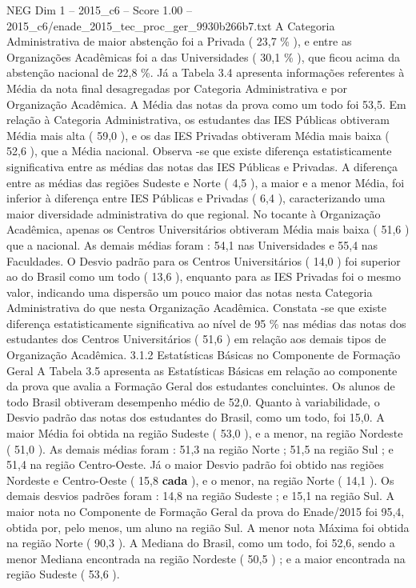 \begin{textsample}{NEG Dim 1 – 2015\_c6 – Score 1.00 – 2015\_c6/enade\_2015\_tec\_proc\_ger\_9930b266b7.txt}
A Categoria Administrativa de maior abstenção foi a Privada ( 23,7 \% ), e entre as Organizações Acadêmicas foi a das Universidades ( 30,1 \% ), que ficou acima da abstenção nacional de 22,8 \%.
Já a Tabela 3.4 apresenta informações referentes à Média da nota final desagregadas por Categoria Administrativa e por Organização Acadêmica.
A Média das notas da prova como um todo foi 53,5.
Em relação à Categoria Administrativa, os estudantes das IES Públicas obtiveram Média mais alta ( 59,0 ), e os das IES Privadas obtiveram Média mais baixa ( 52,6 ), que a Média nacional.
Observa -se que existe diferença estatisticamente significativa entre as médias das notas das IES Públicas e Privadas.
A diferença entre as médias das regiões Sudeste e Norte ( 4,5 ), a maior e a menor Média, foi inferior à diferença entre IES Públicas e Privadas ( 6,4 ), caracterizando uma maior diversidade administrativa do que regional.
No tocante à Organização Acadêmica, apenas os Centros Universitários obtiveram Média mais baixa ( 51,6 ) que a nacional.
As demais médias foram : 54,1 nas Universidades e 55,4 nas Faculdades.
O Desvio padrão para os Centros Universitários ( 14,0 ) foi superior ao do Brasil como um todo ( 13,6 ), enquanto para as IES Privadas foi o mesmo valor, indicando uma dispersão um pouco maior das notas nesta Categoria Administrativa do que nesta Organização Acadêmica.
Constata -se que existe diferença estatisticamente significativa ao nível de 95 \% nas médias das notas dos estudantes dos Centros Universitários ( 51,6 ) em relação aos demais tipos de Organização Acadêmica. 3.1.2 Estatísticas Básicas no Componente de Formação Geral A Tabela 3.5 apresenta as Estatísticas Básicas em relação ao componente da prova que avalia a Formação Geral dos estudantes concluintes.
Os alunos de todo Brasil obtiveram desempenho médio de 52,0.
Quanto à variabilidade, o Desvio padrão das notas dos estudantes do Brasil, como um todo, foi 15,0.
A maior Média foi obtida na região Sudeste ( 53,0 ), e a menor, na região Nordeste ( 51,0 ).
As demais médias foram : 51,3 na região Norte ; 51,5 na região Sul ; e 51,4 na região Centro-Oeste.
Já o maior Desvio padrão foi obtido nas regiões Nordeste e Centro-Oeste ( 15,8 \textbf{cada} ), e o menor, na região Norte ( 14,1 ).
Os demais desvios padrões foram : 14,8 na região Sudeste ; e 15,1 na região Sul.
A maior nota no Componente de Formação Geral da prova do Enade/2015 foi 95,4, obtida por, pelo menos, um aluno na região Sul.
A menor nota Máxima foi obtida na região Norte ( 90,3 ).
A Mediana do Brasil, como um todo, foi 52,6, sendo a menor Mediana encontrada na região Nordeste ( 50,5 ) ; e a maior encontrada na região Sudeste ( 53,6 ).

\end{textsample}
